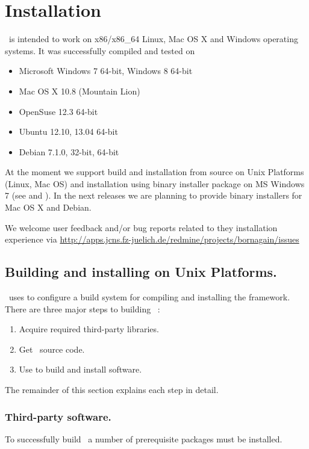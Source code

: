 \newpage
\chapter{Installation} 

\BornAgain\ is intended to work on x86/x86\_64 Linux, Mac OS X and Windows operating systems. It was successfully compiled and tested on
\begin{itemize}
\item Microsoft Windows 7 64-bit, Windows 8 64-bit
\item Mac OS X 10.8 (Mountain Lion)
\item OpenSuse 12.3 64-bit
\item Ubuntu 12.10, 13.04 64-bit
\item Debian 7.1.0, 32-bit, 64-bit
\end{itemize}

At the moment we support build and installation from source on Unix Platforms 
(Linux, Mac OS) and
installation using binary installer package on MS Windows 7 (see
 and ).
In the next releases we are planning to provide binary installers for 
Mac OS X and Debian.

We welcome user feedback and/or bug reports related to they installation experience
via \url{http://apps.jcns.fz-juelich.de/redmine/projects/bornagain/issues}


\section{Building and installing on Unix Platforms.} 


\BornAgain\ uses  to configure a build system for compiling and installing the framework. There are three major steps to building \BornAgain\ :
\begin{enumerate}[1.]
\item Acquire required third-party libraries.
\item Get \BornAgain\ source code.
\item Use  to build and install software.
\end{enumerate}
The remainder of this section explains each step in detail.

\subsection{Third-party software.}
To successfully build \BornAgain\ a number of prerequisite packages must be installed.


